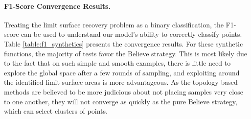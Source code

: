 \paragraph{F1-Score Convergence Results.}
Treating the limit surface recovery problem as a binary classification, the F1-score can be used to understand our model's ability to correctly classify points.
%
Table \ref{table:f1_synthetics} presents the convergence results.
For these synthetic functions, the majority of tests favor the Believe strategy.
%
This is most likely due to the fact that on such simple and smooth examples, there is little need to explore the global space after a few rounds of sampling, and exploiting around the identified limit surface areas is more advantageous.
%
As the topology-based methods are believed to be more judicious about not placing samples very close to one another, they will not converge as quickly as the pure Believe strategy, which can select clusters of points.

